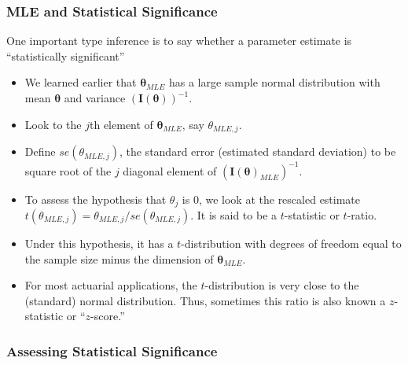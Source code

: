 \documentclass[]{book}
\theoremstyle{definition}
\theoremstyle{definition}
\theoremstyle{definition}
\theoremstyle{remark}
\begin{document}
\subsubsection{MLE and Statistical
Significance}\label{mle-and-statistical-significance}

One important type inference is to say whether a parameter estimate is
``statistically significant''

\begin{itemize}
\item
  We learned earlier that \(\boldsymbol \theta_{MLE}\) has a large
  sample normal distribution with mean \(\boldsymbol \theta\) and
  variance \(\left( \mathbf{I}(\boldsymbol \theta) \right)^{-1}\).
\item
  Look to the \(j\)th element of \(\boldsymbol \theta_{MLE}\), say
  \(\theta_{MLE,j}\).
\item
  Define \(se(\theta_{MLE,j})\), the standard error (estimated standard
  deviation) to be square root of the \(j\) diagonal element of
  \(\left( \mathbf{I}(\boldsymbol \theta)_{MLE} \right)^{-1}\).
\item
  To assess the hypothesis that \(\theta_j\) is 0, we look at the
  rescaled estimate
  \(t(\theta_{MLE,j})=\theta_{MLE,j}/se(\theta_{MLE,j})\). It is said to
  be a \(t\)-statistic or \(t\)-ratio.
\item
  Under this hypothesis, it has a \(t\)-distribution with degrees of
  freedom equal to the sample size minus the dimension of
  \(\boldsymbol \theta_{MLE}\).
\item
  For most actuarial applications, the \(t\)-distribution is very close
  to the (standard) normal distribution. Thus, sometimes this ratio is
  also known a \(z\)-statistic or ``\(z\)-score.''
\end{itemize}

\subsubsection{Assessing Statistical
Significance}\label{assessing-statistical-significance}
\end{document}
